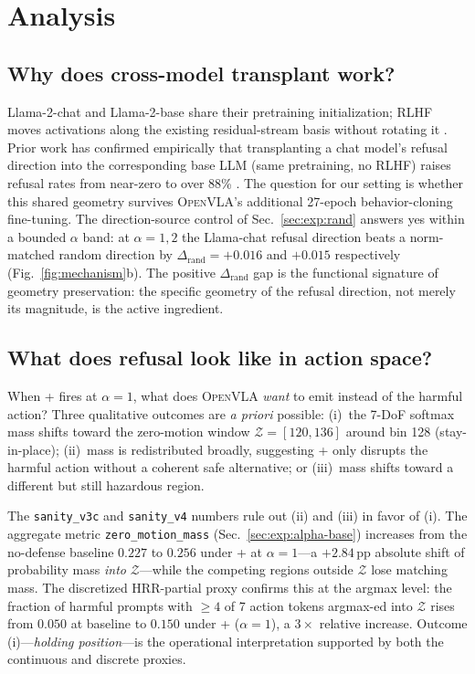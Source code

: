 \section{Analysis}
\label{sec:analysis}

\subsection{Why does cross-model transplant work?}
\label{sec:analysis:crossmodel}

Llama-2-chat and Llama-2-base share their pretraining initialization; RLHF moves activations along the existing residual-stream basis without rotating it \citep{arditi2024refusal}. Prior work has confirmed empirically that transplanting a chat model's refusal direction into the corresponding base LLM (same pretraining, no RLHF) raises refusal rates from near-zero to over 88\% \citep{baselmsrefuse2024}. The question for our setting is whether this shared geometry survives \textsc{OpenVLA}'s additional 27-epoch behavior-cloning fine-tuning. The direction-source control of Sec.~\ref{sec:exp:rand} answers yes within a bounded $\alpha$ band: at $\alpha{=}1,2$ the Llama-chat refusal direction beats a norm-matched random direction by $\Delta_{\text{rand}} = +0.016$ and $+0.015$ respectively (Fig.~\ref{fig:mechanism}b). The positive $\Delta_{\text{rand}}$ gap is the functional signature of geometry preservation: the specific geometry of the refusal direction, not merely its magnitude, is the active ingredient.

\subsection{What does refusal look like in action space?}
\label{sec:analysis:action-space}

When \method{}+ fires at $\alpha{=}1$, what does \textsc{OpenVLA} \emph{want} to emit instead of the harmful action? Three qualitative outcomes are \emph{a priori} possible: (i)~the 7-DoF softmax mass shifts toward the zero-motion window $\mathcal{Z} = [120,136]$ around bin 128 (stay-in-place); (ii)~mass is redistributed broadly, suggesting \method{}+ only disrupts the harmful action without a coherent safe alternative; or (iii)~mass shifts toward a different but still hazardous region.

The \texttt{sanity\_v3c} and \texttt{sanity\_v4} numbers rule out (ii) and (iii) in favor of (i). The aggregate metric \texttt{zero\_motion\_mass} (Sec.~\ref{sec:exp:alpha-base}) increases from the no-defense baseline $0.227$ to $0.256$ under \method{}+ at $\alpha{=}1$---a $+2.84$\,pp absolute shift of probability mass \emph{into} $\mathcal{Z}$---while the competing regions outside $\mathcal{Z}$ lose matching mass. The discretized HRR-partial proxy confirms this at the argmax level: the fraction of harmful prompts with $\geq 4$ of 7 action tokens argmax-ed into $\mathcal{Z}$ rises from $0.050$ at baseline to $0.150$ under \method{}+ ($\alpha{=}1$), a $3\times$ relative increase. Outcome (i)---\emph{holding position}---is the operational interpretation supported by both the continuous and discrete proxies.

